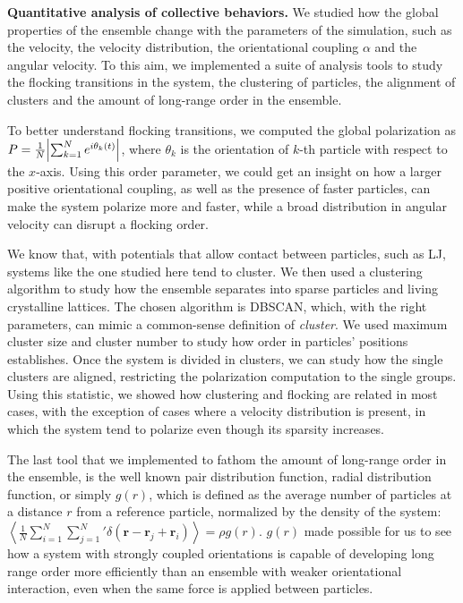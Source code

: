 \documentclass[a4paper, notitlepage]{report} %
\begin{document}
	\textbf{Quantitative analysis of collective behaviors.}
	We studied how the global properties of the ensemble change with the parameters of the simulation, such as the velocity, the velocity distribution, the orientational coupling $\alpha$ and the angular velocity.
	To this aim, we implemented a suite of analysis tools to study the flocking transitions in the system, the clustering of particles, the alignment of clusters and the amount of long-range order in the ensemble.

	To better understand flocking transitions, we computed the global polarization as $P = \frac{1}{N} \abs{\sum_{k=1}^{N} e^{i \theta_k(t)}}$, where $\theta_k$ is the orientation of $k$-th particle with respect to the $x$-axis.
	Using this order parameter, we could get an insight on how a larger positive orientational coupling, as well as the presence of faster particles, can make the system polarize more and faster, while a broad distribution in angular velocity can disrupt a flocking order. %

	We know that, with potentials that allow contact between particles, such as LJ, systems like the one studied here tend to cluster.
	We then used a clustering algorithm to study how the ensemble separates into sparse particles and living crystalline lattices.
	The chosen algorithm is DBSCAN, which, with the right parameters, can mimic a common-sense definition of \emph{cluster}.
	We used maximum cluster size and cluster number to study how order in particles' positions establishes.
	Once the system is divided in clusters, we can study how the single clusters are aligned, restricting the polarization computation to the single groups.
	Using this statistic, we showed how clustering and flocking are related in most cases, with the exception of cases where a velocity distribution is present, in which the system tend to polarize even though its sparsity increases.

	The last tool that we implemented to fathom the amount of long-range order in the ensemble, is the well known pair distribution function, radial distribution function, or simply $g(r)$, which is defined \cite{hansen90a} as the average number of particles at a distance $r$ from a reference particle, normalized by the density of the system:
	$\left\langle \frac{1}{N} \sum_{i=1}^{N} \sum_{j=1}^{N}{}' \delta (\mathbf{r} - \mathbf{r}_j + \mathbf{r}_i) \right\rangle = \rho g(r)$.
	$g(r)$ made possible for us to see how a system with strongly coupled orientations is capable of developing long range order more efficiently than an ensemble with weaker orientational interaction, even when the same force is applied between particles. 
	
\end{document}
